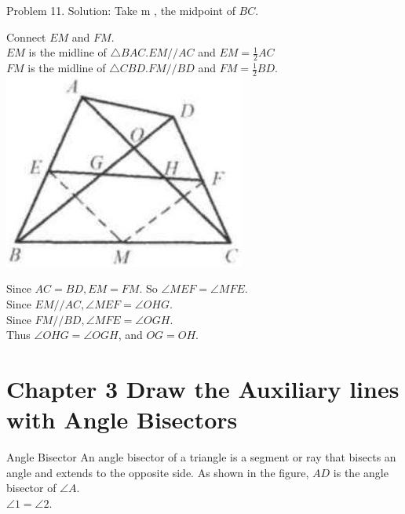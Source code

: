 \documentclass[10pt]{article}
\begin{document}
Problem 11. Solution:
Take m , the midpoint of \(B C\).


Connect \(E M\) and \(F M\).\\
\(E M\) is the midline of \(\triangle B A C . E M / / A C\) and \(E M=\frac{1}{2} A C\)\\
\(F M\) is the midline of \(\triangle C B D . F M / / B D\) and \(F M=\frac{1}{2} B D\).\\
\includegraphics[max width=\textwidth, center]{2025_04_17_97bc1f7e44d93c271a88g-052}

Since \(A C=B D, E M=F M\). So \(\angle M E F=\angle M F E\).\\
Since \(E M / / A C, \angle M E F=\angle O H G\).\\
Since \(F M / / B D, \angle M F E=\angle O G H\).\\
Thus \(\angle O H G=\angle O G H\), and \(O G=O H\).

\section*{Chapter 3 Draw the Auxiliary lines with Angle Bisectors}
Angle Bisector
An angle bisector of a triangle is a segment or ray that bisects an angle and extends to the opposite side. As shown in the figure, \(A D\) is the angle bisector of \(\angle A\).\\
\(\angle 1=\angle 2\).
\end{document}
